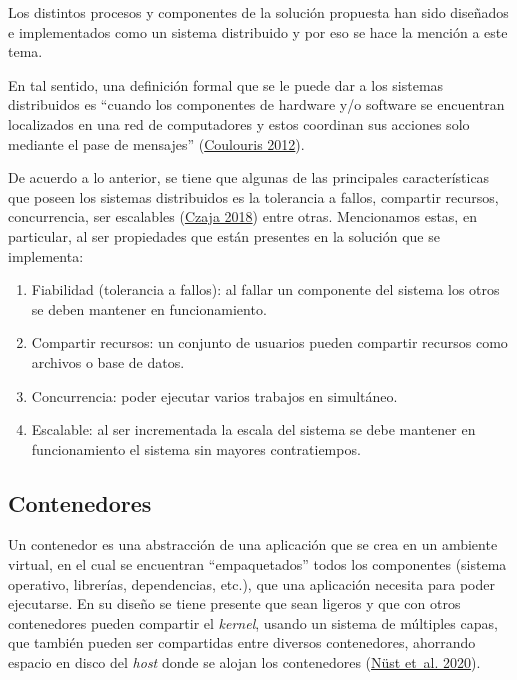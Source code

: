 \documentclass[
  12pt,
  openany]{book}
\begin{document}
Los distintos procesos y componentes de la solución propuesta han sido diseñados e implementados como un sistema distribuido y por eso se hace la mención a este tema.

En tal sentido, una definición formal que se le puede dar a los sistemas distribuidos es ``cuando los componentes de hardware y/o software se encuentran localizados en una red de computadores y estos coordinan sus acciones solo mediante el pase de mensajes'' (\protect\hyperlink{ref-distribu2012}{Coulouris 2012}).

De acuerdo a lo anterior, se tiene que algunas de las principales características que poseen los sistemas distribuidos es la tolerancia a fallos, compartir recursos, concurrencia, ser escalables (\protect\hyperlink{ref-czaja2018}{Czaja 2018}) entre otras. Mencionamos estas, en particular, al ser propiedades que están presentes en la solución que se implementa:

\begin{enumerate}
\def\labelenumi{\arabic{enumi}.}
\item
  Fiabilidad (tolerancia a fallos): al fallar un componente del sistema los otros se deben mantener en funcionamiento.
\item
  Compartir recursos: un conjunto de usuarios pueden compartir recursos como archivos o base de datos.
\item
  Concurrencia: poder ejecutar varios trabajos en simultáneo.
\item
  Escalable: al ser incrementada la escala del sistema se debe mantener en funcionamiento el sistema sin mayores contratiempos.
\end{enumerate}

\hypertarget{contenedores}{%
\subsection{Contenedores}\label{contenedores}}

Un contenedor es una abstracción de una aplicación que se crea en un ambiente virtual, en el cual se encuentran ``empaquetados'' todos los componentes (sistema operativo, librerías, dependencias, etc.), que una aplicación necesita para poder ejecutarse. En su diseño se tiene presente que sean ligeros y que con otros contenedores pueden compartir el \emph{kernel}, usando un sistema de múltiples capas, que también pueden ser compartidas entre diversos contenedores, ahorrando espacio en disco del \emph{host} donde se alojan los contenedores (\protect\hyperlink{ref-nuxfcst2020}{Nüst et~al. 2020}).
\end{document}
